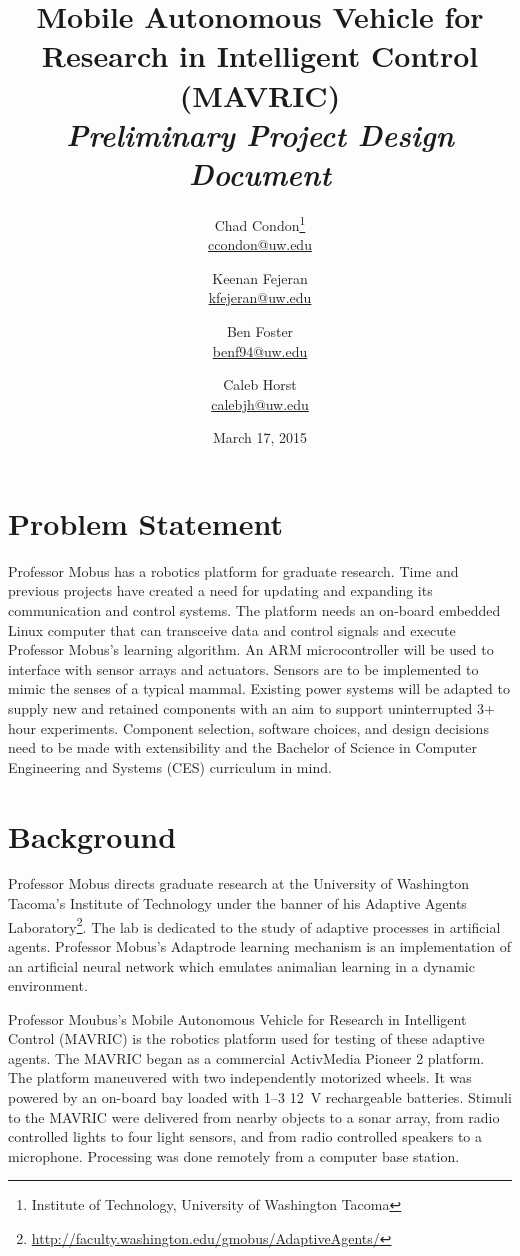 \documentclass{article}
\title{
        Mobile Autonomous Vehicle for Research in Intelligent Control \\
        (MAVRIC) \\
        \Large \emph{Preliminary Project Design Document}
    }
\author{
        Chad Condon\thanks{
        Institute of Technology, University of Washington Tacoma} \\
        \url{ccondon@uw.edu}
        \and
        Keenan Fejeran\footnotemark[1] \\
        \url{kfejeran@uw.edu}
        \and
        Ben Foster\footnotemark[1] \\
        \url{benf94@uw.edu}
        \and
        Caleb Horst\footnotemark[1] \\
        \url{calebjh@uw.edu}
    }
\date{March 17, 2015}
\begin{document}
{
    \maketitle
    \thispagestyle{empty}
    \clearpage
}

{
    \tableofcontents
    \clearpage
    \listoffigures
    \listoftables
    \clearpage
}

\setcounter{page}{1}

\section{Problem Statement} %
    \label{sec:problem_statement}

    Professor Mobus has a robotics platform for graduate research.
    Time and previous projects have created a need
    for updating and expanding its communication and control systems.
    The platform needs an on-board embedded Linux computer
    that can transceive data and control signals
    and execute Professor Mobus's learning algorithm.
    An ARM microcontroller will be used
    to interface with sensor arrays and actuators.
    Sensors are to be implemented to mimic the senses of a typical mammal.
    Existing power systems will be adapted
    to supply new and retained components
    with an aim to support uninterrupted 3+ hour experiments.
    Component selection, software choices, and design decisions
    need to be made with extensibility
    and the Bachelor of Science in Computer Engineering and Systems (CES) curriculum in mind.

\section{Background} %
    \label{sec:background}

    Professor Mobus directs graduate research
    at the University of Washington Tacoma's Institute of Technology
    under the banner of his Adaptive Agents Laboratory\footnote{%
        \url{http://faculty.washington.edu/gmobus/AdaptiveAgents/}
    }.
    The lab is dedicated to the study of adaptive processes
    in artificial agents. Professor Mobus's Adaptrode learning mechanism%
    \cite{adaptrode}
    is an implementation of an artificial neural network
    which emulates animalian learning in a dynamic environment.

    Professor Moubus's
    Mobile Autonomous Vehicle for Research in Intelligent Control
    (MAVRIC)\cite{mavric}
    is the robotics platform used for testing of these adaptive agents.
    The MAVRIC began as a commercial ActivMedia Pioneer 2 platform.
    The platform maneuvered with two independently motorized wheels.
    It was powered by an on-board bay
    loaded with 1--3 \SI{12}{\volt} rechargeable batteries.
    Stimuli to the MAVRIC were delivered
    from nearby objects to a sonar array,
    from radio controlled lights to four light sensors, and
    from radio controlled speakers to a microphone.
    Processing was done remotely from a computer base station.
\end{document}
